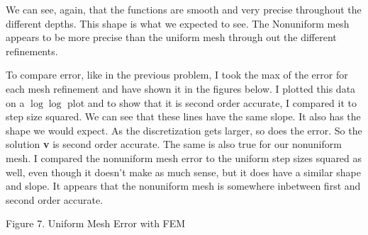 \documentclass[11pt, oneside]{article}   	%
\begin{document}
\begin{enumerate}
\vspace{2mm}

We can see, again, that the functions are smooth and very precise throughout the different depths. This shape is what we expected to see. The Nonuniform mesh appears to be more precise than the uniform mesh through out the different refinements.

To compare error, like in the previous problem, I took the max of the error for each mesh refinement and have shown it in the figures below. I plotted this data on a $\log \log$ plot and to show that it is second order accurate, I compared it to step size squared. We can see that these lines have the same slope. It also has the shape we would expect. As the discretization gets larger, so does the error. So the solution \textbf{v} is second order accurate. The same is also true for our nonuniform mesh. I compared the nonuniform mesh error to the uniform step sizes squared as well, even though it doesn't make as much sense, but it does have a similar shape and slope. It appears that the nonuniform mesh is somewhere inbetween first and second order accurate.

\vspace{2mm}

\centerline {}
\centerline{Figure 7. Uniform Mesh Error with FEM}

\vspace{2mm}


\end{enumerate}
\end{document}
